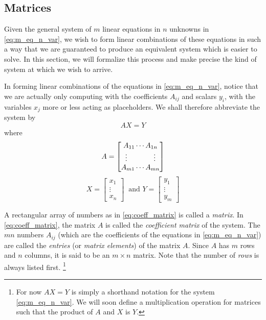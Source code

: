 \documentclass[12pt,letterpaper,reqno]{article}
\numberwithin{equation}{section}
\newcommand{\ti}[1]{\textit{#1}}
\begin{document}
\subsection{Matrices}
Given the general system of $m$ linear equations in $n$ unknowns in \eqref{eq:m_eq_n_var}, we wish to form linear combinations of these equations in such a way that we are guaranteed to produce an equivalent system which is easier to solve. In this section, we will formalize this process and make precise the kind of system at which we wish to arrive.

	In forming linear combinations of the equations in \eqref{eq:m_eq_n_var}, notice that we are actually only computing with the coefficients $A_{ij}$ and scalars $y_i$, with the variables $x_j$ more or less acting as placeholders. We shall therefore abbreviate the system by
	\begin{equation}
		AX=Y
	\end{equation}
	where 
	\begin{equation}\label{eq:coeff_matrix}
		A=\begin{bmatrix}
			A_{11} \cdots A_{1n} \\
			\vdots \hspace{1.3cm} \vdots \\
			A_{m1} \cdots A_{mn}
		\end{bmatrix}
	\end{equation} 
	\begin{equation}
		X=\begin{bmatrix}
			x_1 \\ \vdots \\ x_n
		\end{bmatrix} \ \text{ and } Y= \begin{bmatrix}
			y_1 \\ \vdots \\ y_m
		\end{bmatrix}
	\end{equation} 
\begin{defn} \label{def:coefficient_matrix}
	A rectangular array of numbers as in \eqref{eq:coeff_matrix} is called a \ti{matrix}. In \eqref{eq:coeff_matrix}, the matrix $A$ is called the \ti{coefficient matrix} of the system. The $mn$ numbers $A_{ij}$ (which are the coefficients of the equations in \eqref{eq:m_eq_n_var}) are called the \ti{entries} (or \ti{matrix elements}) of the matrix $A$. Since $A$ has $m$ rows and $n$ columns, it is said to be an $m \times n$ matrix. Note that the number of \emph{rows} is always listed first. \footnote{For now $AX=Y$ is simply a shorthand notation for the system \eqref{eq:m_eq_n_var}.
	We will soon define a multiplication operation for matrices such that the product of $A$ and $X$ is $Y$.}
\end{defn}
\end{document}

